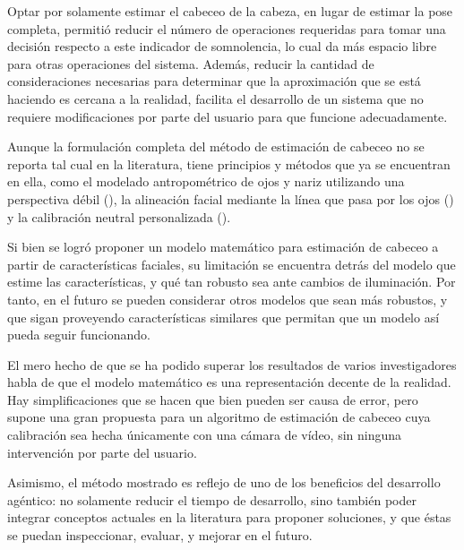 Optar por solamente estimar el cabeceo de la cabeza, en lugar de estimar la pose completa, permitió reducir el número de operaciones requeridas para tomar una decisión respecto a este indicador de somnolencia, lo cual da más espacio libre para otras operaciones del sistema. Además, reducir la cantidad de consideraciones necesarias para determinar que la aproximación que se está haciendo es cercana a la realidad, facilita el desarrollo de un sistema que no requiere modificaciones por parte del usuario para que funcione adecuadamente.  

Aunque la formulación completa del método de estimación de cabeceo no se reporta tal cual en la literatura, tiene principios y métodos que ya se encuentran en ella, como el modelado antropométrico de ojos y nariz utilizando una perspectiva débil (\cite{horprasert1996}), la alineación facial mediante la línea que pasa por los ojos (\cite{nikolaidis2000}) y la calibración neutral personalizada (\cite{bergasa2006}). 

Si bien se logró proponer un modelo matemático para estimación de cabeceo a partir de características faciales, su limitación se encuentra detrás del modelo que estime las características, y qué tan robusto sea ante cambios de iluminación. Por tanto, en el futuro se pueden considerar otros modelos que sean más robustos, y que sigan proveyendo características similares que permitan que un modelo así pueda seguir funcionando.

El mero hecho de que se ha podido superar los resultados de varios investigadores habla de que el modelo matemático es una representación decente de la realidad. Hay simplificaciones que se hacen que bien pueden ser causa de error, pero supone una gran propuesta para un algoritmo de estimación de cabeceo cuya calibración sea hecha únicamente con una cámara de vídeo, sin ninguna intervención por parte del usuario. 

Asimismo, el método mostrado es reflejo de uno de los beneficios del desarrollo agéntico: no solamente reducir el tiempo de desarrollo, sino también poder integrar conceptos actuales en la literatura para proponer soluciones, y que éstas se puedan inspeccionar, evaluar, y mejorar en el futuro.


